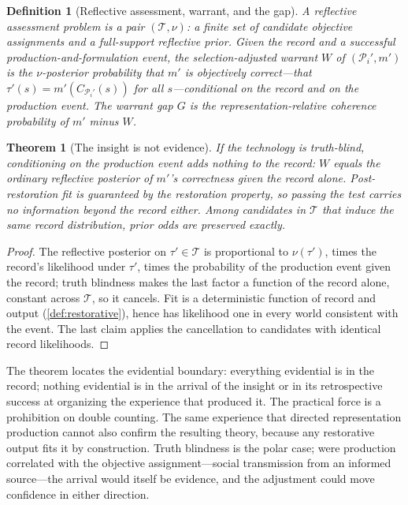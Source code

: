 \documentclass[11pt]{article}
\newtheorem{definition}[assumption]{Definition}
\newtheorem{theorem}[assumption]{Theorem}
\theoremstyle{definition}
\begin{document}
\begin{definition}[Reflective assessment, warrant, and the gap]
\label{def:warrant}
A reflective assessment problem is a pair $(\mathcal T,\nu)$: a finite set
of candidate objective assignments and a full-support reflective prior.
Given the record and a successful production-and-formulation event, the
\emph{selection-adjusted warrant} $W$ of $(\mathcal P_i',m')$ is the
$\nu$-posterior probability that $m'$ is objectively correct---that
$\tau'(s)=m'(C_{\mathcal P_i'}(s))$ for all $s$---conditional on the record
\emph{and} on the production event.  The \emph{warrant gap} $G$ is the
representation-relative coherence probability of $m'$ minus $W$.
\end{definition}

\begin{theorem}[The insight is not evidence]
\label{thm:uninformative}
If the technology is truth-blind, conditioning on the production event adds
nothing to the record: $W$ equals the ordinary reflective posterior of
$m'$'s correctness given the record alone.  Post-restoration fit is
guaranteed by the restoration property, so passing the test carries no
information beyond the record either.  Among candidates in $\mathcal T$ that
induce the same record distribution, prior odds are preserved exactly.
\end{theorem}

\begin{proof}
The reflective posterior on $\tau'\in\mathcal T$ is proportional to
$\nu(\tau')$, times the record's likelihood under $\tau'$, times the
probability of the production event given the record; truth blindness makes
the last factor a function of the record alone, constant across
$\mathcal T$, so it cancels.  Fit is a deterministic function of record and
output (\cref{def:restorative}), hence has likelihood one in every world
consistent with the event.  The last claim applies the cancellation to
candidates with identical record likelihoods.
\end{proof}

The theorem locates the evidential boundary: everything evidential is in
the record; nothing evidential is in the arrival of the insight or in its
retrospective success at organizing the experience that produced it.  The
practical force is a prohibition on double counting.  The same experience
that directed representation production cannot also confirm the resulting
theory, because any restorative output fits it by construction.  Truth
blindness is the polar case; were production correlated with the objective
assignment---social transmission from an informed source---the arrival would
itself be evidence, and the adjustment could move confidence in either
direction.
\end{document}
